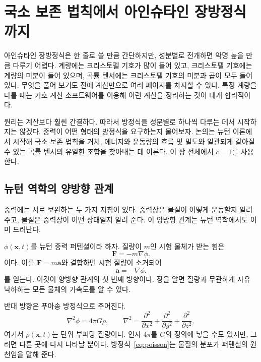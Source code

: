 \chapter{국소 보존 법칙에서 아인슈타인 장방정식까지}

아인슈타인 장방정식은 한 줄로 쓸 만큼 간단하지만, 성분별로 전개하면 악명 높을 만큼 다루기 어렵다. 계량에는 크리스토펠 기호가 많이 들어 있고, 크리스토펠 기호에는 계량의 미분이 들어 있으며, 곡률 텐서에는 크리스토펠 기호의 미분과 곱이 모두 들어 있다. 무엇을 풀어 보기도 전에 계산만으로 여러 페이지를 차지할 수 있다. 특정 계량을 다룰 때는 기호 계산 소프트웨어를 이용해 이런 계산을 정리하는 것이 대개 합리적이다.

원리는 계산보다 훨씬 간결하다. 따라서 방정식을 성분별로 하나씩 다루는 데서 시작하지는 않겠다. 중력이 어떤 형태의 방정식을 요구하는지 물어보자. 논의는 뉴턴 이론에서 시작해 국소 보존 법칙을 거쳐, 에너지와 운동량의 흐름 및 밀도와 일관되게 같아질 수 있는 곡률 텐서의 유일한 조합을 찾아내는 데 이른다. 이 장 전체에서 \(c=1\)를 사용한다.

\section{뉴턴 역학의 양방향 관계}

중력에는 서로 보완하는 두 가지 지침이 있다. 중력장은 물질이 어떻게 운동할지 알려 주고, 물질은 중력장이 어떤 상태일지 알려 준다. 이 양방향 관계는 뉴턴 역학에서도 이미 드러난다.

\(\phi(\mathbf{x},t)\)를 뉴턴 중력 퍼텐셜이라 하자. 질량이 \(m\)인 시험 물체가 받는 힘은
\begin{equation}
 \mathbf{F}=-m\nabla\phi.
\end{equation}
이다. 이를 \(\mathbf{F}=m\mathbf{a}\)와 결합하면 시험 질량이 소거되어
\begin{equation}
 \mathbf{a}=-\nabla\phi.
\end{equation}
를 얻는다. 이것이 양방향 관계의 첫 번째 방향이다. 장을 알면 질량과 무관하게 자유 낙하하는 모든 물체의 가속도를 알 수 있다.

반대 방향은 푸아송 방정식으로 주어진다.
\begin{equation}
 \nabla^2\phi=4\pi G\rho,
 \qquad
 \nabla^2=
 \frac{\partial^2}{\partial x^2}
 +\frac{\partial^2}{\partial y^2}
 +\frac{\partial^2}{\partial z^2},
 \label{eq:poisson}
\end{equation}
여기서 \(\rho(\mathbf{x},t)\)는 단위 부피당 질량이다. 인자 \(4\pi\)를 \(G\)의 정의에 넣을 수도 있지만, 그러면 다른 곳에 다시 나타날 뿐이다. 방정식~\eqref{eq:poisson}는 물질의 분포가 퍼텐셜의 원천임을 말해 준다.

